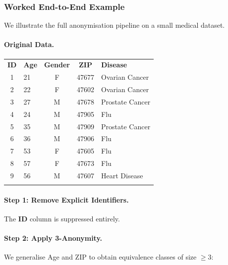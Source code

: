 \subsubsection{Worked End-to-End Example}
\label{sec:worked_example}

We illustrate the full anonymisation pipeline on a small medical dataset.

\paragraph{Original Data.}

\begin{center}
\begin{tabular}{clccp{3cm}}
\hline\noalign{\smallskip}
\textbf{ID} & \textbf{Age} & \textbf{Gender} & \textbf{ZIP} & \textbf{Disease}\\
\noalign{\smallskip}\svhline\noalign{\smallskip}
1 & 21 & F & 47677 & Ovarian Cancer\\
2 & 22 & F & 47602 & Ovarian Cancer\\
3 & 27 & M & 47678 & Prostate Cancer\\
4 & 24 & M & 47905 & Flu\\
5 & 35 & M & 47909 & Prostate Cancer\\
6 & 36 & M & 47906 & Flu\\
7 & 53 & F & 47605 & Flu\\
8 & 57 & F & 47673 & Flu\\
9 & 56 & M & 47607 & Heart Disease\\
\noalign{\smallskip}\hline\noalign{\smallskip}
\end{tabular}
\end{center}

\paragraph{Step 1: Remove Explicit Identifiers.}
The \textbf{ID} column is suppressed entirely.

\paragraph{Step 2: Apply 3-Anonymity.}
We generalise Age and ZIP to obtain equivalence classes of size $\geq 3$:

